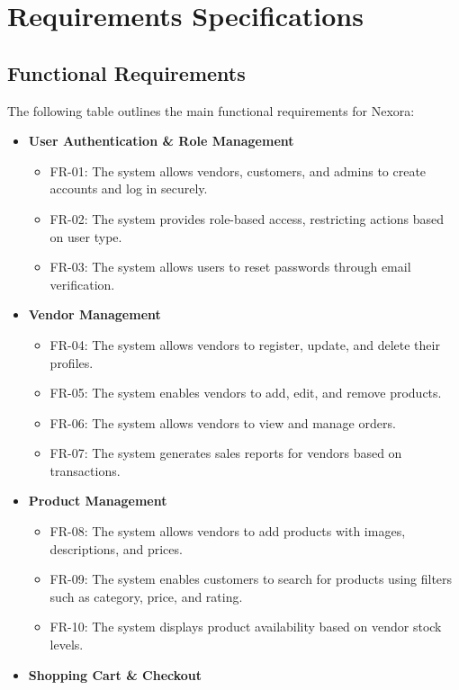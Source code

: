 \chapter{Requirements Specifications}

\section{Functional Requirements}
The following table outlines the main functional requirements for Nexora:

\begin{itemize}
    \item \textbf{User Authentication \& Role Management}
    \begin{itemize}
        \item FR-01: The system allows vendors, customers, and admins to create accounts and log in securely.
        \item FR-02: The system provides role-based access, restricting actions based on user type.
        \item FR-03: The system allows users to reset passwords through email verification.
    \end{itemize}
    \item \textbf{Vendor Management}
    \begin{itemize}
        \item FR-04: The system allows vendors to register, update, and delete their profiles.
        \item FR-05: The system enables vendors to add, edit, and remove products.
        \item FR-06: The system allows vendors to view and manage orders.
        \item FR-07: The system generates sales reports for vendors based on transactions.
    \end{itemize}
    \item \textbf{Product Management}
    \begin{itemize}
        \item FR-08: The system allows vendors to add products with images, descriptions, and prices.
        \item FR-09: The system enables customers to search for products using filters such as category, price, and rating.
        \item FR-10: The system displays product availability based on vendor stock levels.
    \end{itemize}
    \item \textbf{Shopping Cart \& Checkout}

\end{itemize}

